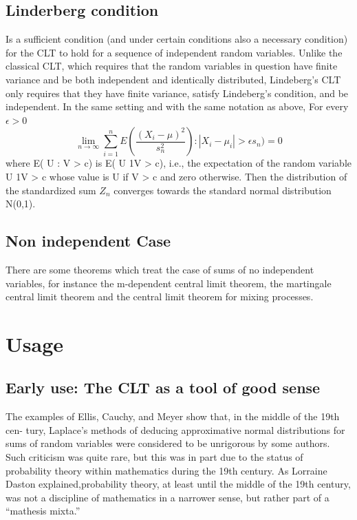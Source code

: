 \documentclass{article}
\begin{document}
\subsection{Linderberg condition}
Is a sufficient condition\cite{Contributors2021Lindeberg} (and under certain conditions also a necessary condition) for the CLT to hold for a sequence of independent random variables. 
Unlike the classical CLT, which requires that the random variables in question have finite variance and be both independent and identically distributed, Lindeberg's CLT only requires that they have finite variance, satisfy Lindeberg's condition, and be independent. 
In the same setting and with the same notation as above, For every $\epsilon > 0$
\[ \lim_{n \rightarrow \infty} \sum_{i=1}^n E(\frac{(X_i -\mu )^2}{s_n^2}) : |X_i -\mu_i|>\epsilon s_n ) = 0 \]
where E( U : V > c) is E( U 1{V > c}), i.e., the expectation of the random variable U 1{V > c} whose value is U if V > c and zero otherwise. Then the distribution of the standardized sum $Z_n$ converges towards the standard normal distribution N(0,1). 

\subsection{Non independent Case}
There are some theorems which treat the case of sums of no independent variables, for instance the m-dependent central limit theorem, the martingale central limit theorem and the central limit theorem for mixing processes. \cite{Tijms2007Understanding}


\section{Usage}

\subsection{Early use: The CLT as a tool of good sense}
The examples of Ellis, Cauchy, and Meyer show that, in the middle of the 19th cen-
tury, Laplace’s methods of deducing approximative normal distributions for sums
of random variables were considered to be unrigorous by some authors.
Such criticism was quite rare, but this was in part due to the status of probability theory
within mathematics during the 19th century. 
As Lorraine Daston \cite{Daston2021Classical} explained,probability theory, at least until the middle of the 19th century, was not a discipline of mathematics in a narrower sense, but rather part of a “mathesis mixta.”
\end{document}
